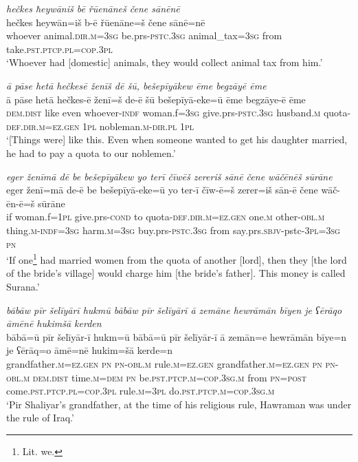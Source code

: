 \ea \label{BP.16}
\textit{hečkes ħeywāniš bē řūenāneš čene sānēnē} \\ 
\gll hečkes ħeywān=iš b-ē řūenāne=š čene sānē=nē \\ 
 whoever animal\textsc{.dir}\textsc{.m}\textsc{=3sg} be.prs\textsc{-pstc}\textsc{.3sg} animal\_tax\textsc{=3sg} from take\textsc{.pst}\textsc{.ptcp}\textsc{.pl}\textsc{=cop}\textsc{.3pl} \\ 
\glt `Whoever had [domestic] animals, they would collect animal tax from him.'
\z 
 
\ea \label{BP.17}
\textit{ā pāse hetā hečkesē ženīš dē šū, bešepīyākew ēme begzāyē ēme} \\ 
\gll ā pāse hetā hečkes-ē ženī=š de-ē šū bešepīyā-eke=ū ēme begzāye-ē ēme \\ 
 \textsc{dem.dist} like even whoever\textsc{-indf} woman.f\textsc{=3sg} give.prs\textsc{-pstc}\textsc{.3sg} husband\textsc{.m} quota\textsc{-def}\textsc{.dir}\textsc{.m}\textsc{=ez.gen} \textsc{1pl} nobleman\textsc{.m}\textsc{-dir}\textsc{.pl} \textsc{1pl} \\ 
\glt `[Things were] like this. Even when someone wanted to get his daughter married, he had to pay a quota  to our noblemen.'
\z 
 
\ea \label{BP.18}
\textit{eger ženīmā dē be bešepīyākew yo terī čīwēš zereriš sānē čene wāčēnēš sūrāne} \\ 
\gll eger ženī=mā de-ē be bešepīyā-eke=ū yo ter-ī čīw-ē=š zerer=iš sān-ē čene wāč-ēn-ē=š sūrāne \\ 
 if woman.f\textsc{=\textsc{1pl}} give.prs\textsc{-cond} to quota\textsc{-def}\textsc{.dir}\textsc{.m}\textsc{=ez.gen} one\textsc{.m} other\textsc{-obl}\textsc{.m} thing\textsc{.m}\textsc{-indf}\textsc{=3sg} harm\textsc{.m}\textsc{=3sg} buy.prs\textsc{-pstc}\textsc{.3sg} from say.prs.\textsc{sbjv-}pstc\textsc{-3pl}\textsc{=3sg} \textsc{pn} \\ 
\glt `If one\footnote{Lit. we.} had married women from the quota of another [lord], then they [the lord of the bride's village] would charge him [the bride’s father]. This money is called Surana.'
\z 
 
\ea \label{BP.21}
\textit{bābāw pīr šelīyārī hukmū bābāw pīr šelīyārī ā zemāne hewrāmān bīyen je ʕērāqo āmēnē hukimšā kerden} \\ 
\gll bābā=ū pīr šelīyār-ī hukm=ū bābā=ū pīr šelīyār-ī ā zemān=e hewrāmān bīye=n je ʕērāq=o āmē=nē hukim=šā kerde=n \\ 
 grandfather\textsc{.m}\textsc{=ez.gen} \textsc{pn} \textsc{pn}\textsc{-obl}\textsc{.m} rule\textsc{.m}\textsc{=ez.gen} grandfather\textsc{.m}\textsc{=ez.gen} \textsc{pn} \textsc{pn}\textsc{-obl}\textsc{.m} \textsc{dem.dist} time\textsc{.m}\textsc{=dem} \textsc{pn} be\textsc{.pst}\textsc{.ptcp}\textsc{.m}\textsc{=cop}\textsc{.3sg}\textsc{.m} from \textsc{pn}\textsc{=\textsc{post}} come\textsc{.pst}\textsc{.ptcp}\textsc{.pl}\textsc{=cop}\textsc{.3pl} rule\textsc{.m}\textsc{=3pl} do\textsc{.pst}\textsc{.ptcp}\textsc{.m}\textsc{=cop}\textsc{.3sg}\textsc{.m} \\ 
\glt `Pir Shaliyar’s grandfather, at the time of his religious rule, Hawraman was under the rule of Iraq.'
\z 
 
